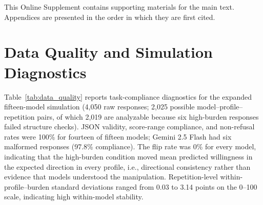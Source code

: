 \maketitle

\setcounter{table}{0}
\renewcommand{\thetable}{S\arabic{table}}

This Online Supplement contains supporting materials for the main text. Appendices are presented in the order in which they are first cited.

\appendix

\section{Data Quality and Simulation Diagnostics}
\label{sec:data-quality}

Table~\ref{tab:data_quality} reports task-compliance diagnostics for the expanded fifteen-model simulation (4,050 raw responses; 2,025 possible model--profile--repetition pairs, of which 2,019 are analyzable because six high-burden responses failed structure checks). JSON validity, score-range compliance, and non-refusal rates were 100\% for fourteen of fifteen models; Gemini 2.5 Flash had six malformed responses (97.8\% compliance). The flip rate was 0\% for every model, indicating that the high-burden condition moved mean predicted willingness in the expected direction in every profile, i.e., directional consistency rather than evidence that models understood the manipulation. Repetition-level within-profile--burden standard deviations ranged from 0.03 to 3.14 points on the 0--100 scale, indicating high within-model stability.

